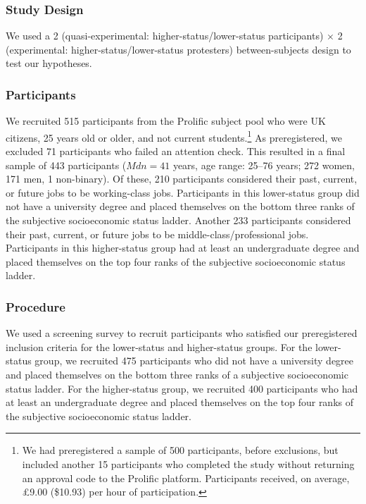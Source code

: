 \documentclass[twocolumn, 11pt, letterpaper]{article}
\begin{document}
\hypertarget{study-design}{%
\subsubsection{Study Design}\label{study-design}}

We used a 2 (quasi-experimental: higher-status/lower-status
participants) \(\times\) 2 (experimental: higher-status/lower-status
protesters) between-subjects design to test our hypotheses.

\hypertarget{participants}{%
\subsubsection{Participants}\label{participants}}

We recruited 515 participants from the Prolific subject pool who were UK
citizens, 25 years old or older, and not current students.\footnote{We
  had preregistered a sample of 500 participants, before exclusions, but
  included another 15 participants who completed the study without
  returning an approval code to the Prolific platform. Participants
  received, on average, \pounds 9.00 (\$10.93) per hour of
  participation.} As preregistered, we excluded 71 participants who
failed an attention check. This resulted in a final sample of 443
participants (\(\textit{Mdn} = 41\) years, age range: 25--76 years; 272
women, 171 men, 1 non-binary). Of these, 210 participants considered
their past, current, or future jobs to be working-class jobs.
Participants in this lower-status group did not have a university degree
and placed themselves on the bottom three ranks of the subjective
socioeconomic status ladder. Another 233 participants considered their
past, current, or future jobs to be middle-class/professional jobs.
Participants in this higher-status group had at least an undergraduate
degree and placed themselves on the top four ranks of the subjective
socioeconomic status ladder.

\hypertarget{procedure}{%
\subsubsection{Procedure}\label{procedure}}

We used a screening survey to recruit participants who satisfied our
preregistered inclusion criteria for the lower-status and higher-status
groups. For the lower-status group, we recruited 475 participants who
did not have a university degree and placed themselves on the bottom
three ranks of a subjective socioeconomic status ladder. For the
higher-status group, we recruited 400 participants who had at least an
undergraduate degree and placed themselves on the top four ranks of the
subjective socioeconomic status ladder.
\end{document}
